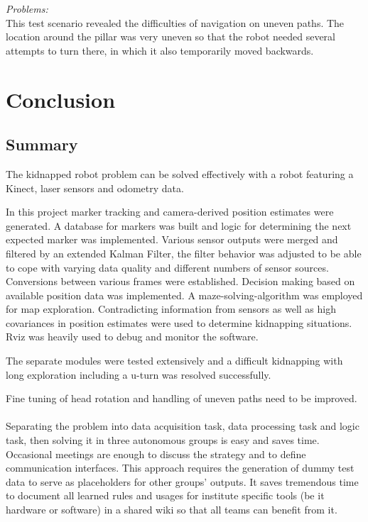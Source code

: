 \begin{description}
\textit{Problems:}\\
This test scenario revealed the difficulties of navigation on uneven paths. The location around the pillar was very uneven so that the robot needed several attempts to turn there, in which it also temporarily moved backwards.
\end{description}

\chapter{Conclusion}
\label{Conclusion chapter}
\section{Summary}
The kidnapped robot problem can be solved effectively with a robot featuring a Kinect, laser sensors and odometry data.

In this project marker tracking and camera-derived position estimates were generated. A database for markers was built and logic for determining the next expected marker was implemented. Various sensor outputs were merged and filtered by an extended Kalman Filter, the filter behavior was adjusted to be able to cope with varying data quality and different numbers of sensor sources. Conversions between various frames were established. Decision making based on available position data was implemented. A maze-solving-algorithm was employed for map exploration. Contradicting information from sensors as well as high covariances in position estimates were used to determine kidnapping situations. Rviz was heavily used to debug and monitor the software.

The separate modules were tested extensively and a difficult kidnapping with long exploration including a u-turn was resolved successfully.

Fine tuning of head rotation and handling of uneven paths need to be improved.
\\\\
Separating the problem into data acquisition task, data processing task and logic task, then solving it in three autonomous groups is easy and saves time. Occasional meetings are enough to discuss the strategy and to define communication interfaces. This approach requires the generation of dummy test data to serve as placeholders for other groups' outputs. It saves tremendous time to document all learned rules and usages for institute specific tools (be it hardware or software) in a shared wiki so that all teams can benefit from it.

